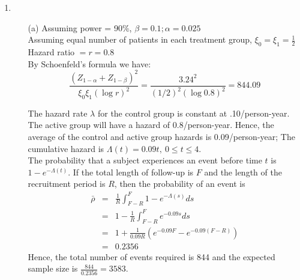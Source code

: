 \documentclass[11pt,a4paper]{article}
\begin{document}
\begin{enumerate}
\rule{\textwidth}{1pt}
\vspace{1in}
\item
\begin{enumerate}
\item[(a)] 
Assuming power = 90\%, $\beta = 0.1; \alpha = 0.025$ \\
Assuming equal number of patients in each treatment group, $\xi_0=\xi_1=\frac{1}{2}$ \\
Hazard ratio $= r = 0.8$ \\
By Schoenfeld’s formula we have:
\[ \dfrac{(Z_{1-\alpha}+Z_{1-\beta})^ 2}{\xi_0\xi_1(\log r)^2} = \dfrac{3.24^ 2}{(1/2)^2(\log 0.8)^2} = 844.09 \]

The hazard rate $\lambda$ for the control group is constant at .10/person-year. The active group will have a hazard of 0.8/person-year. Hence, the average of the control and active group hazards is 0.09/person-year; The cumulative hazard is $\Lambda(t) = 0.09t, \ 0 \leq t \leq 4$. \\
The probability that a subject experiences an event before time $t$ is $1 - e^{-\Lambda(t)}$. If the total length of follow-up is $F$ and the length of the recruitment period is $R$, then the probability of an event is
\begin{eqnarray*}
\bar{\rho} &=& \frac{1}{R} \int_{F - R}^{F} 1 - e^{-\Lambda(s)}ds \\
           &=& 1 - \frac{1}{R} \int_{F - R}^{F} e^{-0.09s} ds \\
           &=& 1 + \frac{1}{0.09R}\left(e^{-0.09F} - e^{-0.09(F - R)} \right) \\
           &=& 0.2356
\end{eqnarray*}
Hence, the total number of events required is 844 and the expected sample size is $\frac{844}{0.2356} = 3583$. 



\end{enumerate}
\end{enumerate}
\end{document}
